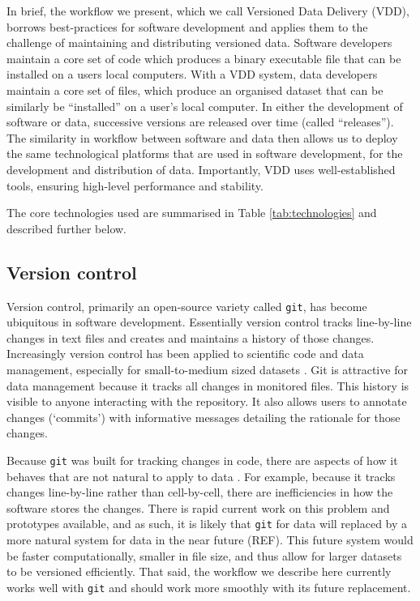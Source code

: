 \documentclass[a4paper,11pt]{article}
\begin{document}

In brief, the workflow we present, which we call Versioned Data Delivery (VDD), borrows best-practices for software development \cite{Perez-Riverol-2016} and applies them to the challenge of maintaining and distributing versioned data. Software developers maintain a core set of code which produces a binary executable file that can be installed on a users local  computers. With a VDD system, data developers maintain a core set of files, which produce an organised dataset that can be similarly be ``installed'' on a user's local computer. In either the development of software or data, successive versions are released over time (called ``releases''). The similarity in workflow between software and data then allows us to deploy the same technological platforms that are used in software development, for the development and distribution of data. Importantly, VDD uses well-established tools, ensuring high-level performance and stability.

The core technologies used are summarised in Table \ref{tab:technologies} and described further below.

\subsection{Version control}

Version control, primarily an open-source variety called \texttt{git}, has become ubiquitous in software development.  Essentially version control tracks line-by-line changes in text files and creates and maintains a history of those changes. Increasingly version control has been applied to scientific code and data management, especially for small-to-medium sized datasets \citep{Ram-2013, Perkel-2016}. Git is attractive for data management because it tracks all changes in monitored files. This history is visible to anyone interacting with the repository. It also allows users to annotate changes (`commits') with informative messages detailing the rationale for those changes.
  
Because \texttt{git} was built for tracking changes in code, there are aspects of how it behaves that are not natural to apply to  data \cite{Perkel-2016}.  For example, because it tracks changes line-by-line rather than cell-by-cell, there are inefficiencies in how the software stores the changes.  There is rapid current work on this problem and prototypes available, and as such, it is likely that \texttt{git} for data will replaced by a more natural system for data in the near future (REF).  This future system would be faster computationally, smaller in file size, and thus allow for larger datasets to be versioned efficiently.  That said, the workflow we describe here currently works well with \texttt{git} and should work more smoothly with its future replacement.
\end{document}
